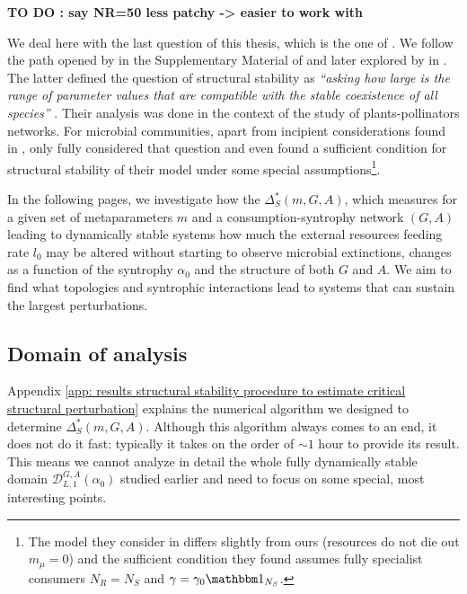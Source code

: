 \documentclass[12pt, titlepage]{report}
\begin{document}
\textbf{TO DO : say NR=50 less patchy -> easier to work with}

We deal here with the last question of this thesis, which is the one of . We follow the path opened by \citeauthor{bastolla_architecture_2009} in the Supplementary Material of \cite{bastolla_architecture_2009} and later explored by  \citeauthor{rohr_structural_2014} in \cite{rohr_structural_2014}. The latter defined the question of structural stability as \textit{``asking how large is the range of parameter values that are compatible with the stable coexistence of all species''} \cite{rohr_structural_2014}. Their analysis was done in the context of the study of plants-pollinators networks.
For microbial communities, apart from incipient considerations found in  \cite{tikhonov_collective_2017,marsland_available_2019}, only \citeauthor{butler_stability_2018} fully considered that question \cite{butler_stability_2018} and even found a sufficient condition for structural stability of their model under some special assumptions\footnote{The model they consider in \cite{butler_stability_2018} differs slightly from ours (\eg resources do not die out $m_\mu=0$) and the sufficient condition they found assumes fully specialist consumers \ie $N_R=N_S$ and $\gamma=\gamma_0 \identity{N_S}$.}.

In the following pages, we investigate how the  $\Delta_S^*(m, G, A)$, which measures for a given set of metaparameters $m$ and a consumption-syntrophy network $(G,A)$ leading to dynamically stable systems how much the external resources feeding rate $l_0$ may be altered without starting to observe microbial extinctions, changes as a function of the syntrophy $\alpha_0$ and the structure of both $G$ and $A$. We aim to find what topologies and syntrophic interactions lead to systems that can sustain the largest perturbations.
\subsection{Domain of analysis}
Appendix \ref{app: results structural stability procedure to estimate critical structural perturbation} explains the numerical algorithm we designed to determine $\Delta_S^*(m, G, A)$. Although this algorithm always comes to an end, it does not do it fast: typically it takes on the order of $\sim 1$ hour to provide its result. This means we cannot analyze in detail the whole fully dynamically stable domain $\mathcal{D}_{L,1}^{G,A}(\alpha_0)$ studied earlier and need to focus on some special, most interesting points.
\end{document}
